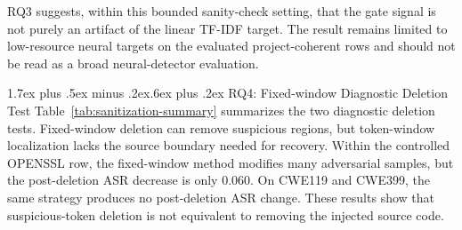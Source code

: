 \documentclass[letterpaper,twocolumn,10pt,twoside]{article}
\makeatletter
\renewcommand\subsection{\@startsection{subsection}{2}{\z@}%
  {1.7ex plus .5ex minus .2ex}{.6ex plus .2ex}%
  {\normalfont\normalsize\bfseries}}
\newcommand{\dataset}[1]{\textsc{#1}}
\makeatother
\begin{document}
RQ3 suggests, within this bounded sanity-check setting, that the gate signal is not purely an artifact of the linear TF-IDF target. The result remains limited to low-resource neural targets on the evaluated project-coherent rows and should not be read as a broad neural-detector evaluation.

\subsection{RQ4: Fixed-window Diagnostic Deletion Test}
Table~\ref{tab:sanitization-summary} summarizes the two diagnostic deletion tests. Fixed-window deletion can remove suspicious regions, but token-window localization lacks the source boundary needed for recovery. Within the controlled \dataset{OPENSSL} row, the fixed-window method modifies many adversarial samples, but the post-deletion ASR decrease is only 0.060. On \dataset{CWE119} and \dataset{CWE399}, the same strategy produces no post-deletion ASR change. These results show that suspicious-token deletion is not equivalent to removing the injected source code.
\end{document}
